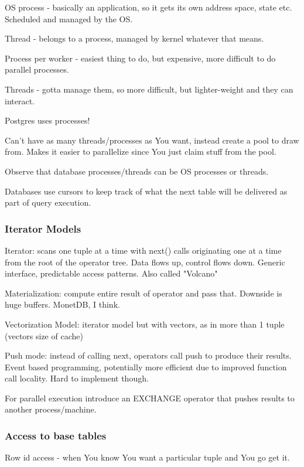 \documentclass{article}
\begin{document}
			OS process - basically an application, so it gets its own address space, state etc. Scheduled and managed by the OS.
			
			Thread - belongs to a process, managed by kernel whatever that means.
			
			Process per worker - easiest thing to do, but expensive, more difficult to do parallel processes.
			
			Threads - gotta manage them, so more difficult, but lighter-weight and they can interact.
			
			Postgres uses processes!
			
			Can't have as many threads/processes as You want, instead create a pool to draw from. Makes it easier to parallelize since You just claim stuff from the pool.
			
			Observe that database processes/threads can be OS processes or threads.
			
			Databases use cursors to keep track of what the next table will be delivered as part of query execution.
			
		\subsubsection{Iterator Models}
		
			Iterator: scans one tuple at a time with next() calls originating one at a time from the root of the operator tree. Data flows up, control flows down. Generic interface, predictable access patterns. Also called "Volcano"
			
			Materialization: compute entire result of operator and pass that. Downside is huge buffers. MonetDB, I think.
			
			Vectorization Model: iterator model but with vectors, as in more than 1 tuple (vectors size of cache)
			
			Push mode: instead of calling next, operators call push to produce their results. Event based programming, potentially more efficient due to improved function call locality. Hard to implement though.
			
			For parallel execution introduce an EXCHANGE operator that pushes results to another process/machine.
			
		\subsubsection{Access to base tables}
		
			Row id access - when You know You want a particular tuple and You go get it.
			
\end{document}
